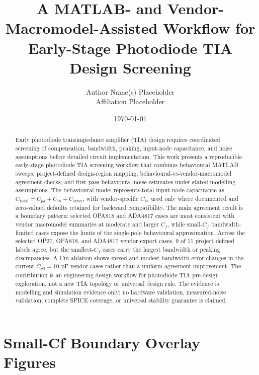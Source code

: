 \documentclass[11pt]{article}
\title{A MATLAB- and Vendor-Macromodel-Assisted Workflow for Early-Stage Photodiode TIA Design Screening}
\author{Author Name(s) Placeholder\\Affiliation Placeholder}
\date{\today}
\begin{document}
\maketitle

\begin{abstract}
Early photodiode transimpedance amplifier (TIA) design requires coordinated screening of compensation, bandwidth, peaking, input-node capacitance, and noise assumptions before detailed circuit implementation. This work presents a reproducible early-stage photodiode TIA screening workflow that combines behavioural MATLAB sweeps, project-defined design-region mapping, behavioural-vs-vendor-macromodel agreement checks, and first-pass behavioural noise estimates under stated modelling assumptions. The behavioural model represents total input-node capacitance as $C_{\mathrm{total}} = C_{pd} + C_{in} + C_{\mathrm{stray}}$, with vendor-specific $C_{in}$ used only where documented and zero-valued defaults retained for backward compatibility. The main agreement result is a boundary pattern: selected OPA818 and ADA4817 cases are most consistent with vendor macromodel summaries at moderate and larger $C_f$, while small-$C_f$ bandwidth-limited cases expose the limits of the single-pole behavioural approximation. Across the selected OP27, OPA818, and ADA4817 vendor-export cases, 9 of 11 project-defined labels agree, but the smallest-$C_f$ cases carry the largest bandwidth or peaking discrepancies. A Cin ablation shows mixed and modest bandwidth-error changes in the current $C_{pd}=10$ pF vendor cases rather than a uniform agreement improvement. The contribution is an engineering design workflow for photodiode TIA pre-design exploration, not a new TIA topology or universal design rule. The evidence is modelling and simulation evidence only; no hardware validation, measured-noise validation, complete SPICE coverage, or universal stability guarantee is claimed.
\end{abstract}



\FloatBarrier

\FloatBarrier

\FloatBarrier

\FloatBarrier

\FloatBarrier

\appendix
\section{Small-Cf Boundary Overlay Figures}
\end{document}
